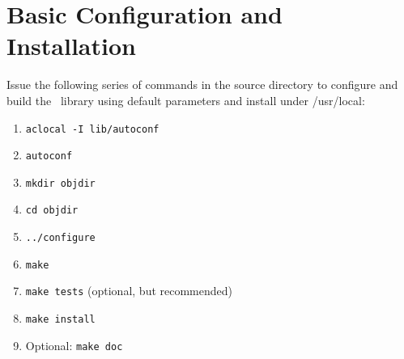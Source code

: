 \documentclass[12pt]{article}
\begin{document}
\section{Basic Configuration and Installation}

Issue the following series of commands in the source directory to configure and build the \LIBINT\
library using default parameters and install under /usr/local:

\begin{enumerate}
\item {\tt aclocal -I lib/autoconf}
\item {\tt autoconf}
\item {\tt mkdir objdir}
\item {\tt cd objdir}
\item {\tt ../configure}
\item {\tt make}
\item {\tt make tests} (optional, but recommended)
\item {\tt make install}
\item Optional: {\tt make doc}
\end{enumerate}
\end{document}
